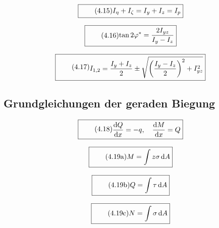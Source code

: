 \documentclass[11pt]{article}
\newcommand{\1}{ {\mathds{1}} }
\newcommand{\td}{\,\text{d}}
\begin{document}
		\begin{equation}
			\boxed{
				\tag{4.15}
				\begin{split}
					I_{\eta} + I_{\zeta} = I_y + I_z = I_p
				\end{split}
			}
		\end{equation}

		\begin{equation}
			\boxed{
				\tag{4.16}
				\begin{split}
					\tan{2\varphi^*} = \frac{2 I_{yz}}{I_y - I_z}
				\end{split}
			}
		\end{equation}

		\begin{equation}
			\boxed{
				\tag{4.17}
				\begin{split}
					I_{1,2} = \frac{I_y + I_z}{2}
					\pm
					\sqrt{\left(\frac{I_y - I_z}{2}\right)^2 + I_{yz}^2}		
				\end{split}
			}
		\end{equation}
		
		\subsection{Grundgleichungen der geraden Biegung}

		\begin{equation}
			\boxed{
				\tag{4.18}
				\begin{split}
					\frac{\text{d}Q}{\text{d}x} = -q,\quad \frac{\text{d}M}{\text{d}x} = Q
				\end{split}
			}
		\end{equation}

		\begin{equation}
			\boxed{
				\tag{4.19a}
				\begin{split}
					M = \int z \sigma \td A
				\end{split}
			}
		\end{equation}


		\begin{equation}
			\boxed{
				\tag{4.19b}
				\begin{split}
					Q = \int \tau \td A
				\end{split}
			}
		\end{equation}

		\begin{equation}
			\boxed{
				\tag{4.19c}
				\begin{split}
					N = \int \sigma \td A
				\end{split}
			}
		\end{equation}
\end{document}
